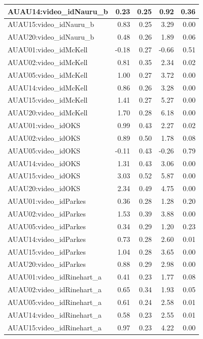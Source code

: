 \documentclass{monashthesis}
\begin{document}
\begin{tabular}{l|r|r|r|r}
\hline
AUAU14:video\_idNauru\_b & 0.23 & 0.25 & 0.92 & 0.36\\
\hline
AUAU15:video\_idNauru\_b & 0.83 & 0.25 & 3.29 & 0.00\\
\hline
AUAU20:video\_idNauru\_b & 0.48 & 0.26 & 1.89 & 0.06\\
\hline
AUAU01:video\_idMcKell & -0.18 & 0.27 & -0.66 & 0.51\\
\hline
AUAU02:video\_idMcKell & 0.81 & 0.35 & 2.34 & 0.02\\
\hline
AUAU05:video\_idMcKell & 1.00 & 0.27 & 3.72 & 0.00\\
\hline
AUAU14:video\_idMcKell & 0.86 & 0.26 & 3.28 & 0.00\\
\hline
AUAU15:video\_idMcKell & 1.41 & 0.27 & 5.27 & 0.00\\
\hline
AUAU20:video\_idMcKell & 1.70 & 0.28 & 6.18 & 0.00\\
\hline
AUAU01:video\_idOKS & 0.99 & 0.43 & 2.27 & 0.02\\
\hline
AUAU02:video\_idOKS & 0.89 & 0.50 & 1.78 & 0.08\\
\hline
AUAU05:video\_idOKS & -0.11 & 0.43 & -0.26 & 0.79\\
\hline
AUAU14:video\_idOKS & 1.31 & 0.43 & 3.06 & 0.00\\
\hline
AUAU15:video\_idOKS & 3.03 & 0.52 & 5.87 & 0.00\\
\hline
AUAU20:video\_idOKS & 2.34 & 0.49 & 4.75 & 0.00\\
\hline
AUAU01:video\_idParkes & 0.36 & 0.28 & 1.28 & 0.20\\
\hline
AUAU02:video\_idParkes & 1.53 & 0.39 & 3.88 & 0.00\\
\hline
AUAU05:video\_idParkes & 0.34 & 0.29 & 1.20 & 0.23\\
\hline
AUAU14:video\_idParkes & 0.73 & 0.28 & 2.60 & 0.01\\
\hline
AUAU15:video\_idParkes & 1.04 & 0.28 & 3.65 & 0.00\\
\hline
AUAU20:video\_idParkes & 0.88 & 0.29 & 2.98 & 0.00\\
\hline
AUAU01:video\_idRinehart\_a & 0.41 & 0.23 & 1.77 & 0.08\\
\hline
AUAU02:video\_idRinehart\_a & 0.65 & 0.34 & 1.93 & 0.05\\
\hline
AUAU05:video\_idRinehart\_a & 0.61 & 0.24 & 2.58 & 0.01\\
\hline
AUAU14:video\_idRinehart\_a & 0.58 & 0.23 & 2.55 & 0.01\\
\hline
AUAU15:video\_idRinehart\_a & 0.97 & 0.23 & 4.22 & 0.00\\

\end{tabular}
\end{document}

